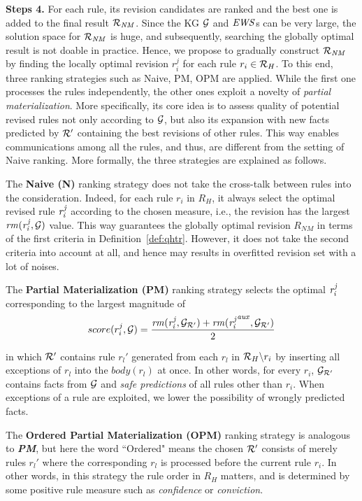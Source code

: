 \smallskip

\noindent \textbf{Steps 4.} For each rule, its revision candidates are ranked and the best one is added to the final result $\mathcal{R}_{\mathit{NM}}$. Since the KG $\mathcal{G}$ and $\mathit{EWS}$s can be very large, the solution space for $\mathcal{R}_{\mathit{NM}}$ is huge, and subsequently, searching the globally optimal result is not doable in practice. Hence, we propose to gradually construct $\mathcal{R}_{\mathit{NM}}$ by finding the locally optimal revision $r_i^{j}$ for each rule $r_i \in \mathcal{R}_{H}$. To this end, three ranking strategies such as Naive, PM, OPM are applied. While the first one processes the rules independently, the other ones exploit a novelty of \emph{partial materialization}. More specifically, its core idea is to assess quality of potential revised rules not only according to $\mathcal{G}$, but also its expansion with new facts predicted by $\mathcal{R}'$ containing the best revisions of other rules. This way enables communications among all the rules, and thus, are different from the setting of Naive ranking. More formally, the three strategies are explained as follows.

The \textbf{Naive (N)} ranking strategy does not take the cross-talk between rules into the consideration. Indeed, for each rule $r_i$ in $R_H$, it always select the optimal revised rule $\mathit{r^j_i}$ according to the chosen measure, i.e., the revision has the largest $\mathit{rm(r^j_{i},\mathcal{G})}$ value. This way guarantees the globally optimal revision $R_{NM}$ in terms of the first criteria in Definition~\ref{def:qhtr}. However, it does not take the second criteria into account at all, and hence may results in overfitted revision set with a lot of noises.

The \textbf{Partial Materialization (PM)} ranking strategy selects the optimal $\mathit{r^j_i}$ corresponding to the largest magnitude of
\begin{equation}
\label{pm}
score(r^j_i,\mathcal{G})=\dfrac{\mathit{rm(r^j_i,\mathcal{G}_{\mathcal{R}'})+rm({r^j_i}^{aux},\mathcal{G}_{\mathcal{R}'})}}{2}
\end{equation}

in which $\mathcal{R}'$ contains rule $r_l'$ generated from each $r_l$ in $\mathcal{R}_H\backslash r_i$ by inserting all exceptions of $r_l$ into the $body(r_l)$ at once. In other words, for every $r_i$, $\mathcal{G}_{\mathcal{R}'}$ contains facts from $\mathcal{G}$ and \textit{safe predictions} of all rules other than $r_i$. When exceptions of a rule are exploited, we lower the possibility of wrongly predicted facts.

The \textbf{Ordered Partial Materialization (OPM)} ranking strategy is analogous to \textbf{\emph{PM}}, but here the word ``Ordered" means the chosen $\mathcal{R}'$ consists of merely rules $r_l'$ where the corresponding $r_l$ is processed before the current rule $r_i$. In other words, in this strategy the rule order in $R_H$ matters, and is determined by some positive rule measure such as \textit{confidence} or \textit{conviction}.